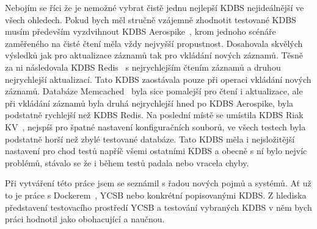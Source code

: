 \documentclass[czech,master,dept460,male,csharp,cpdeclaration]{diploma}
\begin{document}
	Nebojím se říci že je nemožné vybrat čistě jednu nejlepší KDBS nejideálnější ve všech ohledech. Pokud bych měl stručně vzájemně zhodnotit testované KDBS musím především vyzdvihnout KDBS Aerospike~\cite{aerospike}, krom jednoho scénáře zaměřeného na čisté čtení měla vždy nejvyšší propustnost. Dosahovala skvělých výsledků jak pro aktualizace záznamů tak pro vkládání nových záznamů. Těsně za ni následovala KDBS Redis~\cite{redis} s nejrychlejším čtením záznamů a druhou nejrychlejší aktualizací. Tato KDBS zaostávala pouze při operaci vkládání nových záznamů. Databáze Memcached~\cite{memcached} byla sice pomalejší pro čtení i aktualizace, ale při vkládání záznamů byla druhá nejrychlejší hned po KDBS Aerospike, byla podstatně rychlejší než KDBS Redis. Na poslední místě se umístila KDBS Riak KV~\cite{riak}, nejspíš pro špatné nastavení konfiguračních souborů, ve všech testech byla podstatně horší než zbylé testované databáze. Tato KDBS měla i nejsložitější nastavení pro chod testů napříč všemi ostatními KDBS a obecně s ní bylo nejvíc problémů, stávalo se že i během testů padala nebo vracela chyby.
	
	Při vytváření této práce jsem se seznámil s řadou nových pojmů a systémů. Ať už to je práce s Dockerem~\cite{docker}, YCSB nebo konkrétní popisovanými KDBS. Z hlediska představení testovacího prostředí YCSB a testování vybraných KDBS v něm bych práci hodnotil jako obohacující a naučnou.
	
	\nocite{*}
	
	\printbibliography[title={Literatura}, heading=bibintoc]
	
\end{document}
